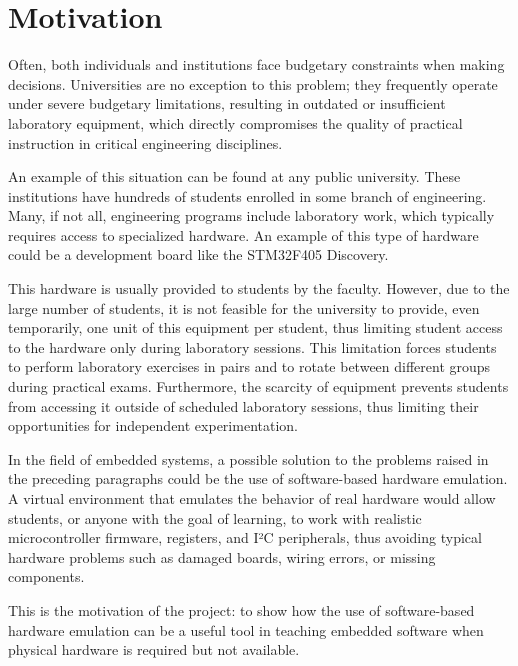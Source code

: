 \section{Motivation}
\label{chap:Motivation}

Often, both individuals and institutions face budgetary constraints when making 
decisions. Universities are no exception to this problem; they frequently operate 
under severe budgetary limitations, resulting in outdated or insufficient laboratory 
equipment, which directly compromises the quality of practical instruction in critical 
engineering disciplines.

An example of this situation can be found at any public university. These 
institutions have hundreds of students enrolled in some branch of engineering. 
Many, if not all, engineering programs include laboratory work, which typically requires 
access to specialized hardware. An example of this type of hardware could be a 
development board like the STM32F405 Discovery.

This hardware is usually provided to students by the faculty. 
However, due to the large number of students, it is not feasible for the university to provide, 
even temporarily, one unit of this equipment per student, thus limiting student access to 
the hardware only during laboratory sessions. This limitation forces students to 
perform laboratory exercises in pairs and to rotate between different groups during practical exams. 
Furthermore, the scarcity of equipment prevents students from 
accessing it outside of scheduled laboratory sessions, thus limiting their opportunities 
for independent experimentation.
  
In the field of embedded systems, a possible solution to the problems raised in 
the preceding paragraphs could be the use of software-based hardware emulation. 
A virtual environment that emulates the behavior of real hardware would allow 
students, or anyone with the goal of learning, to work with realistic microcontroller 
firmware, registers, and I²C peripherals, thus avoiding typical hardware problems 
such as damaged boards, wiring errors, or missing components.

This is the motivation of the project: to show how the use of software-based 
hardware emulation can be a useful tool in teaching embedded software when physical 
hardware is required but not available.